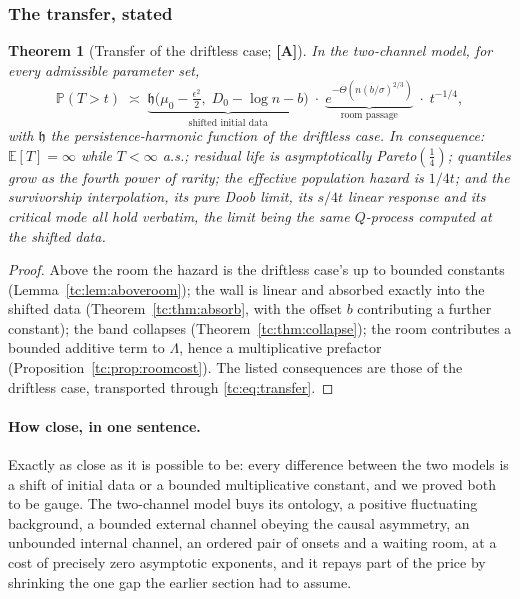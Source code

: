 \documentclass[11pt]{article}
\numberwithin{equation}{section}
\theoremstyle{plain}
\newtheorem{theorem}{Theorem}[section]
\theoremstyle{definition}
\theoremstyle{remark}
\newcommand{\E}{\mathbb{E}}
\newcommand{\PP}{\mathbb{P}}
\newcommand{\hm}{\mathfrak{h}}
\begin{document}
\subsubsection{The transfer, stated}\label{tc:subsub:transferstated}

\begin{theorem}[Transfer of the driftless case; \textbf{[A]}]
\label{tc:thm:transfer}
In the two-channel model, for every admissible parameter set,
\begin{equation}\label{tc:eq:transfer}
\PP(T>t)\;\asymp\;\underbrace{\hm\bigl(\mu_{0}-\tfrac{\epsilon^{2}}{2},
\;D_{0}-\log n-b\bigr)}_{\text{shifted initial data}}\;\cdot\;
\underbrace{e^{-\Theta\left(n(b/\sigma)^{2/3}\right)}}_{\text{room
passage}}\;\cdot\;t^{-1/4},
\end{equation}
with $\hm$ the persistence-harmonic function of the driftless case. In
consequence: $\E[T]=\infty$ while $T<\infty$ a.s.; residual life is
asymptotically Pareto$(\tfrac14)$; quantiles grow as the fourth power of
rarity; the effective population hazard is $1/4t$; and the survivorship
interpolation, its pure Doob limit, its $s/4t$ linear response and its
critical mode all hold verbatim, the limit being the same $Q$-process
computed at the shifted data.
\end{theorem}

\begin{proof}
Above the room the hazard is the driftless case's up to bounded constants
(Lemma~\ref{tc:lem:aboveroom}); the wall is linear and absorbed exactly
into the shifted data (Theorem~\ref{tc:thm:absorb}, with the offset $b$
contributing a further constant); the band collapses
(Theorem~\ref{tc:thm:collapse}); the room contributes a bounded additive
term to $\Lambda$, hence a multiplicative prefactor
(Proposition~\ref{tc:prop:roomcost}). The listed consequences are those
of the driftless case, transported through
\eqref{tc:eq:transfer}.
\end{proof}

\paragraph{How close, in one sentence.}\label{tc:rem:howclose}
Exactly as close as it is possible to be: every difference between the
two models is a shift of initial data or a bounded multiplicative
constant, and we proved both to be gauge. The two-channel model
buys its ontology, a positive fluctuating background, a bounded
external channel obeying the causal asymmetry, an unbounded internal
channel, an ordered pair of onsets and a waiting room, at a cost of
precisely zero asymptotic exponents, and it repays part of the price by
shrinking the one gap the earlier section had to assume.
\end{document}

